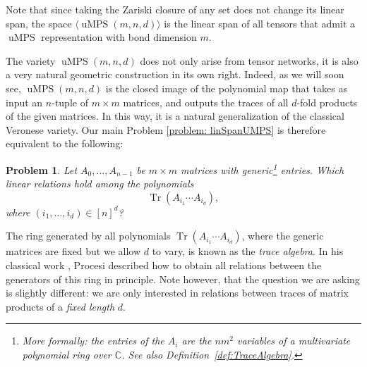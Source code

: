 \documentclass[pdftex]{sigma}
\numberwithin{equation}{section}
\newtheorem{problem}[Theorem]{Problem}
\DeclareMathOperator{\Tr}{Tr}
\newcommand{\CC}{\mathbb{C}}
\DeclareMathOperator{\uMPS}{uMPS}
\begin{document}
Note that since taking the Zariski closure of any set does not change its linear span, the space $\langle\uMPS(m,n,d)\rangle$ is the linear span of all tensors that admit a $\uMPS$ representation with bond dimension $m$.

The variety $\uMPS(m,n,d)$ does not only arise from tensor networks, it is also a very natural geometric construction in its own right. Indeed, as we will soon see, $\uMPS(m,n,d)$ is the closed image of the polynomial map that takes as input an $n$-tuple of $m \times m$ matrices, and outputs the traces of all $d$-fold products of the given matrices. In this way, it is a natural generalization of the classical Veronese variety. Our main Problem \ref{problem: linSpanUMPS} is therefore equivalent to the following:
\begin{problem}
Let $A_0,\dots,A_{n-1}$ be $m \times m$ matrices with generic\footnote{More formally: the entries of the $A_i$ are the $nm^2$ variables of a multivariate polynomial ring over $\CC$. See also Definition~\ref{def:TraceAlgebra}.} entries. Which linear relations hold among the polynomials
\[
\Tr(A_{i_1}\cdots A_{i_d}),
\]
where $(i_1,\dots,i_d) \in [n]^d$?
\end{problem}
The ring generated by all polynomials $\Tr(A_{i_1}\cdots A_{i_d})$, where the generic matrices are fixed but we allow $d$ to vary, is known as the \emph{trace algebra}. In his classical work \cite{procesi1976invariant}, Procesi described how to obtain all relations between the generators of this ring in principle. Note however, that the question we are asking is slightly different: we are only interested in relations between traces of matrix products of a \emph{fixed length} $d$.
\end{document}
